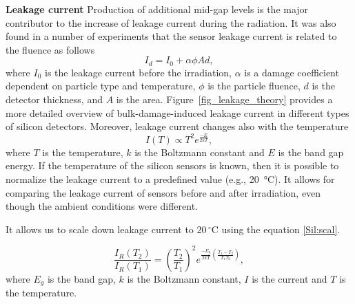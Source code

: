 \textbf{Leakage current}\bigbreak
Production of additional mid-gap levels is the major contributor to the increase of leakage current during the radiation. It was also found in a number of experiments that the sensor leakage current is related to the fluence as follows
\begin{equation}
\label{eq:fluence}
    I_{d} = I_{0} + \alpha \phi Ad,
\end{equation}
where $I_{0}$ is the leakage current before the irradiation, $\alpha$ is a damage coefficient dependent on particle type and temperature, $\phi$ is the particle fluence, $d$ is the detector thickness, and $A$ is the area. Figure~\ref{fig_leakage_theory} provides a more detailed overview of bulk-damage-induced leakage current in different types of silicon detectors. Moreover, leakage current changes also with the temperature
\begin{equation}
\label{Sil:temp}
    I(T) \propto T^{2}e^{\frac{-E}{2kT}},
\end{equation}
where $T$ is the temperature, $k$ is the Boltzmann constant and $E$ is the band gap energy. 
If the temperature of the silicon sensors is known, then it is possible to normalize the leakage current to a predefined value (e.g., \SI{20}{\celsius}). It allows for comparing the leakage current of sensors before and after irradiation, even though the ambient conditions were different. 

It allows us to scale down leakage current to $20\,^{\circ}$C using the equation \ref{Sil:scal}.
 
\begin{equation}
\label{Sil:scal}
    \frac{I_{R}(T_{2})}{I_{R}(T_{1})} = (\frac{T_{2}}{T_{1}})^{2}e^{\frac{-E_{g}}{2kT}(\frac{T_{1}-T_{2}}{T_{1}T_{2}})},
\end{equation}
where $E_{g}$ is the band gap, $k$ is the Boltzmann constant, $I$ is the current and $T$ is the temperature.

